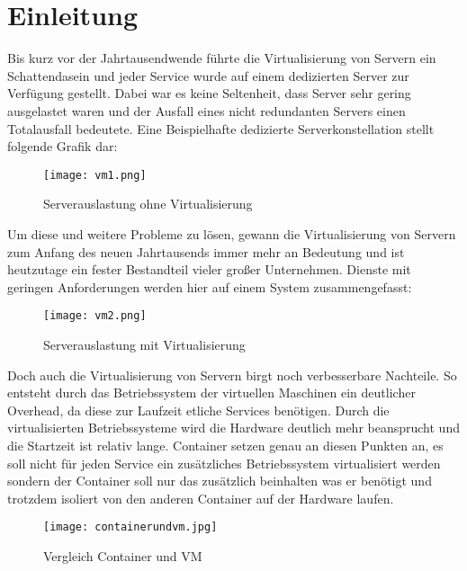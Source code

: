 \section{Einleitung}
\label{sec:Einleitung}

Bis kurz vor der Jahrtausendwende führte die Virtualisierung von Servern ein Schattendasein und jeder Service wurde auf einem dedizierten Server zur Verfügung gestellt. Dabei war es keine Seltenheit, dass Server sehr gering ausgelastet waren und der Ausfall eines nicht redundanten Servers einen Totalausfall bedeutete. Eine Beispielhafte dedizierte Serverkonstellation stellt folgende Grafik dar:
\begin{figure}[H]
	\begin{center}
		\texttt{[image: vm1.png]}
	\end{center}
	\caption[Serverauslastung ohne Virtualisierung]{Serverauslastung ohne Virtualisierung \footnotemark}
	\label{fig:HW1}
\end{figure}
Um diese und weitere Probleme zu lösen, gewann die Virtualisierung von Servern zum Anfang des neuen Jahrtausends immer mehr an Bedeutung und ist heutzutage ein fester Bestandteil vieler großer Unternehmen. Dienste mit geringen Anforderungen werden hier auf einem System zusammengefasst:
\begin{figure}[H]
	\begin{center}
		\texttt{[image: vm2.png]}
	\end{center}
	\caption[Serverauslastung mit Virtualisierung]{Serverauslastung mit Virtualisierung \footnotemark}
	\label{fig:HW1}
\end{figure}
Doch auch die Virtualisierung von Servern birgt noch verbesserbare Nachteile. So entsteht durch das Betriebssystem der virtuellen Maschinen ein deutlicher Overhead, da diese zur Laufzeit etliche Services benötigen. Durch die virtualisierten Betriebssysteme wird die Hardware deutlich mehr beansprucht und die Startzeit ist relativ lange.
Container setzen genau an diesen Punkten an, es soll nicht für jeden Service ein zusätzliches Betriebssystem virtualisiert werden sondern der Container soll nur das zusätzlich beinhalten was er benötigt und trotzdem isoliert von den anderen Container auf der Hardware laufen.\cite{12005068320161201}\cite{redhat}
\begin{figure}[H]
	\begin{center}
		\texttt{[image: containerundvm.jpg]}
	\end{center}
	\caption[Vergleich Container und VM]{Vergleich Container und VM \footnotemark}
	\label{fig:HW1}
\end{figure}

